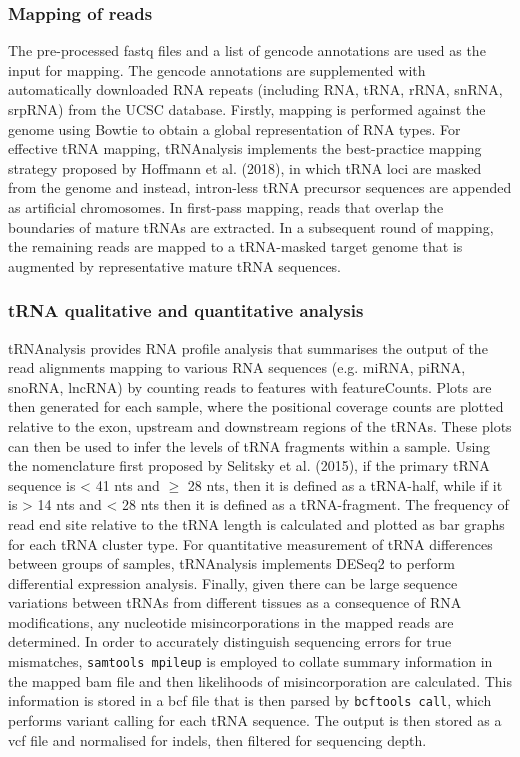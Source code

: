 \subsubsection{Mapping of reads}
The pre-processed fastq files and a list of gencode annotations are used as the input for mapping.
The gencode annotations are supplemented with automatically downloaded RNA repeats (including RNA, tRNA, rRNA, snRNA, srpRNA) from the UCSC database\cite{karolchik2004ucsc}.
Firstly, mapping is performed against the genome using Bowtie\cite{langmead2009ultrafast} to obtain a global representation of RNA types.
For effective tRNA mapping, tRNAnalysis implements the best-practice mapping strategy proposed by Hoffmann et al. (2018), in which tRNA loci are masked from the genome and instead, intron-less tRNA precursor sequences are appended as artificial chromosomes\cite{hoffmann2018accurate}.
In first-pass mapping, reads that overlap the boundaries of mature tRNAs are extracted.
In a subsequent round of mapping, the remaining reads are mapped to a tRNA-masked target genome that is augmented by representative mature tRNA sequences.

\subsubsection{tRNA qualitative and quantitative analysis}
tRNAnalysis provides RNA profile analysis that summarises the output of the read alignments mapping to various RNA sequences (e.g. miRNA, piRNA, snoRNA, lncRNA) by counting reads to features with featureCounts\cite{liao2014featurecounts}.
Plots are then generated for each sample, where the positional coverage counts are plotted relative to the exon, upstream and downstream regions of the tRNAs.
These plots can then be used to infer the levels of tRNA fragments within a sample.
Using the nomenclature first proposed by Selitsky et al. (2015), if the primary tRNA sequence is < 41 nts and $\geq$ 28 nts, then it is defined as a tRNA-half, while if it is > 14 nts and < 28 nts then it is defined as a tRNA-fragment\cite{selitsky2015small}.
The frequency of read end site relative to the tRNA length is calculated and plotted as bar graphs for each tRNA cluster type.
For quantitative measurement of tRNA differences between groups of samples, tRNAnalysis implements DESeq2 to perform differential expression analysis\cite{love2014moderated}.
Finally, given there can be large sequence variations between tRNAs from different tissues as a consequence of RNA modifications\cite{hoffmann2018accurate, vilmi2005sequence, lin2019trnaviz}, any nucleotide misincorporations in the mapped reads are determined.
In order to accurately distinguish sequencing errors for true mismatches, \texttt{samtools mpileup} is employed to collate summary information in the mapped bam file and then likelihoods of misincorporation are calculated.
This information is stored in a bcf file that is then parsed by \texttt{bcftools call}, which performs variant calling for each tRNA sequence\cite{li2009sequence}.
The output is then stored as a vcf file and normalised for indels, then filtered for sequencing depth.


